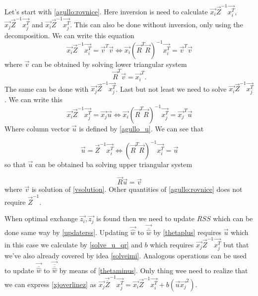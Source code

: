 Let's start with \ref{agullo:rovnice}. Here inversion is need to calculate 
$\vec{x_i}\vec{Z}^{-1}\vec{x_i^T}$, $\vec{x_j}\vec{Z}^{-1}\vec{x_j^T}$ and $\vec{x_i}\vec{Z}^{-1}\vec{x_j^T}$. This can also be done without inversion, only using the decomposition. We can write this equation
\begin{equation} \label{solveimi}
	\vec{x_i}\vec{Z}^{-1}\vec{x_i^T} = \vec{v}^T\vec{v} 	\iff \vec{x_i}(\vec{R}^T\vec{R})^{-1}\vec{x_i^T} = \vec{v}^T\vec{v}
\end{equation} 
where $\vec{v}$ can be obtained by solving lower triangular system
\begin{equation} \label{vsolution}
	\vec{R}^T\vec{v} = \vec{x_i}^T.
\end{equation} 
The same can be done with  $\vec{x_j}\vec{Z}^{-1}\vec{x_j^T}$. Last but not least we need to solve 
$\vec{x_i}\vec{Z}^{-1}\vec{x_j^T}$. We can write this 
\begin{equation}
	\vec{x_i}\vec{Z}^{-1}\vec{x_j^T} = \vec{x_j}\vec{u} 	\iff \vec{x_i}(\vec{R}^T\vec{R})^{-1}\vec{x_j^T} = \vec{x_j}^T\vec{u}
\end{equation} 
Where column vector $\vec{u}$ is defined by \ref{agullo_u}. We can see that 

\begin{equation}
	\vec{u} = \vec{Z}^{-1}\vec{x_i^T} 	\iff (\vec{R}^T\vec{R})^{-1}\vec{x_i^T} = \vec{u}
\end{equation}
so that $\vec{u}$ can be obtained ba solving upper triangular system 

\begin{equation} \label{solve_u_qr}
	\vec{R}\vec{u} = \vec{v}
\end{equation}
where $\vec{v}$ is solution of \ref{vsolution}. Other quantities of \ref{agullo:rovnice} does not require $\vec{Z}^{-1}$.

When optimal exchange $\vec{z_i}, \vec{z_j}$ is found then we need to update $RSS$ which can be done same way by \ref{updaterss}. Updating $\vec{\hat{w}}$ to  $\vec{\overline{\hat{w}}}$ by \ref{thetaplus} requires
$\vec{u}$  which in this case we calculate by \ref{solve_u_qr} and $b$ which requires  $\vec{x_j}\vec{Z}^{-1}\vec{x_j^T}$ but that we've also already covered by idea \ref{solveimi}. Analogous operations can be used to update $\vec{\overline{\hat{w}}}$ to $\vec{\overline{\overline{\hat{w}}}}$  by means of \ref{thetaminus}. Only thing wee need to realize that we can express \ref{xjoverlinez} as $\vec{x_j}\vec{\overline{{Z}}}^{-1}\vec{x_j^T} = \vec{x_i}\vec{{{Z}}}^{-1}\vec{x_i^T} + b(\vec{u}\vec{x_j}^2)$.

